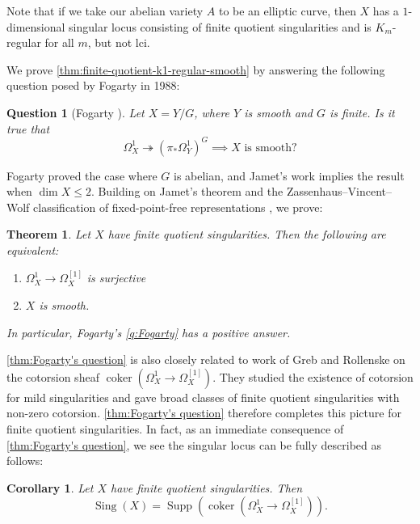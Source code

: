 \documentclass{amsart}
\newtheorem{theorem}{Theorem}[section]
\newtheorem{corollary}[corollary]{Corollary}
\newtheorem{question}[question]{Question}
\theoremstyle{definition}
\DeclareMathOperator{\Supp}{Supp}
\DeclareMathOperator{\coker}{coker}
\DeclareMathOperator{\Sing}{Sing}
\begin{document}
Note that if we take our abelian variety $A$ to be an elliptic curve, then $X$ has a $1$-dimensional singular locus consisting of finite quotient singularities and is $K_m$-regular for all $m$, but not lci.

\vspace{1em}

We prove \autoref{thm:finite-quotient-k1-regular-smooth} by answering the following question posed by Fogarty in 1988:

\begin{question}[Fogarty \cite{FOGARTY1988}]\label{q:Fogarty}
    Let $X=Y/G$, where $Y$ is smooth and $G$ is finite. Is it true that
    \[\Omega_X^1\twoheadrightarrow (\pi_*\Omega_Y^1)^G \implies \text{$X$ is smooth}?\]
\end{question}

Fogarty proved the case where $G$ is abelian, and Jamet's work \cite{Jamet} implies the result when $\dim X \le 2$. Building on Jamet's theorem and the Zassenhaus–Vincent–Wolf classification of fixed-point-free representations \cite{Zassenhaus1935, Vincent1947,Wolf2011,Stepanov}, we prove:



\begin{theorem}\label{thm:Fogarty's question}
    Let $X$ have finite quotient singularities. Then the following are equivalent:
    \begin{enumerate}
        \item $\Omega^1_X \to \Omega^{[1]}_X$ is surjective
        \item $X$ is smooth.
    \end{enumerate}
    In particular, Fogarty's \autoref{q:Fogarty} has a positive answer.
\end{theorem}

\autoref{thm:Fogarty's question} is also closely related to work of Greb and Rollenske \cite{GrebRollenske} on the cotorsion sheaf $\coker(\Omega^1_X\to\Omega^{[1]}_X)$. They studied the existence of cotorsion for mild singularities and gave broad classes of finite quotient singularities with non-zero cotorsion. \autoref{thm:Fogarty's question} therefore completes this picture for finite quotient singularities. In fact, as an immediate consequence of \autoref{thm:Fogarty's question}, we see the singular locus can be fully described as follows:

\begin{corollary}\label{cor:cotorsion}
    Let $X$ have finite quotient singularities. Then
    \[
        \Sing(X)=\Supp(\coker(\Omega^1_X\to\Omega^{[1]}_X)).
    \]
\end{corollary}
\end{document}
